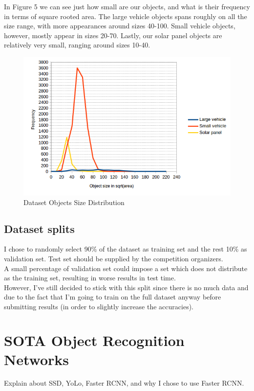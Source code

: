 \documentclass[]{article}
\begin{document}
In Figure 5 we can see just how small are our objects, and what is their frequency in terms of square rooted area. The large vehicle objects spans roughly on all the size range, with more appearances around sizes 40-100. Small vehicle objects, however, mostly appear in sizes 20-70. Lastly, our solar panel objects are relatively very small, ranging around sizes 10-40.
\begin{figure}[!h]
\centering
\includegraphics[width=0.7\linewidth]{"charts/Dataset Objects Size Distribution"}
\caption{Dataset Objects Size Distribution}
\label{fig:Dataset Objects Size Distribution}
\end{figure}

\subsection{Dataset splits}
I chose to randomly select 90\% of the dataset as training set and the rest 10\% as validation set. Test set should be supplied by the competition organizers.\\
A small percentage of validation set could impose a set which does not distribute as the training set, resulting in worse results in test time.\\
However, I've still decided to stick with this split since there is no much data and due to the fact that I'm going to train on the full dataset anyway before submitting results (in order to slightly increase the accuracies).

\section{SOTA Object Recognition Networks}
Explain about SSD, YoLo, Faster RCNN, and why I chose to use Faster RCNN.
\end{document}
